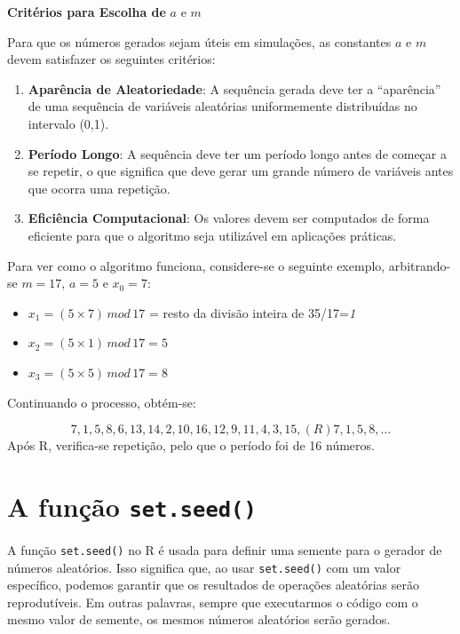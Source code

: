 \documentclass[
]{book}
\providecommand{\tightlist}{%
  \setlength{\itemsep}{0pt}\setlength{\parskip}{0pt}}
\begin{document}
\textbf{Critérios para Escolha de} \(a\) e \(m\)

Para que os números gerados sejam úteis em simulações, as constantes \(a\)
e \(m\) devem satisfazer os seguintes critérios:

\begin{enumerate}
\def\labelenumi{\arabic{enumi}.}
\tightlist
\item
  \textbf{Aparência de Aleatoriedade}: A sequência gerada deve ter a
  ``aparência'' de uma sequência de variáveis aleatórias uniformemente
  distribuídas no intervalo (0,1).
\item
  \textbf{Período Longo}: A sequência deve ter um período longo antes de
  começar a se repetir, o que significa que deve gerar um grande
  número de variáveis antes que ocorra uma repetição.
\item
  \textbf{Eficiência Computacional}: Os valores devem ser computados de
  forma eficiente para que o algoritmo seja utilizável em aplicações
  práticas.
\end{enumerate}

Para ver como o algoritmo funciona, considere-se o seguinte exemplo, arbitrando-se \(m=17\), \(a=5\) e \(x_0=7\):

\begin{itemize}
\tightlist
\item
  \(x_1 = (5\times 7) \, mod \, 17\) = resto da divisão inteira de 35/17=\emph{1}
\item
  \(x_2 = (5 \times 1)\, mod \, 17= 5\)
\item
  \(x_3 = (5 \times 5)\, mod \, 17= 8\)
\end{itemize}

Continuando o processo, obtém-se:

\[7, 1, 5, 8, 6, 13, 14, 2, 10, 16, 12, 9, 11, 4, 3, 15, (R) 7, 1, 5, 8,\ldots\]
Após R, verifica-se repetição, pelo que o período foi de 16 números.

\section{\texorpdfstring{A função \texttt{set.seed()}}{A função set.seed()}}\label{a-funuxe7uxe3o-set.seed}

A função \texttt{set.seed()} no R é usada para definir uma semente para o gerador de números aleatórios. Isso significa que, ao usar \texttt{set.seed()} com um valor específico, podemos garantir que os resultados de operações aleatórias serão reprodutíveis. Em outras palavras, sempre que executarmos o código com o mesmo valor de semente, os mesmos números aleatórios serão gerados.
\end{document}

